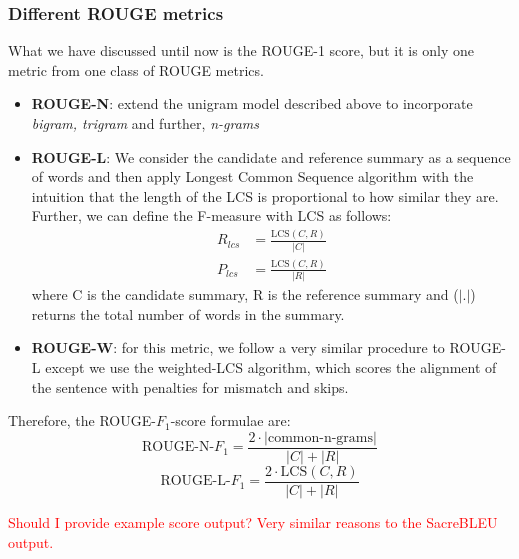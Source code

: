 \documentclass[12pt,a4paper,twoside,openright]{report}
\newcommand{\red}[1]{\textcolor{red}{#1}}
\newcommand{\fone}{$F_1$}
\begin{document}
\subsubsection{Different ROUGE metrics}
What we have discussed until now is the ROUGE-1 score, but it is only one metric from one class of ROUGE metrics.
\begin{itemize}
    \item \textbf{ROUGE-N}: extend the unigram model described above to incorporate \textit{bigram, trigram} and further, \textit{n-grams}
    \item \textbf{ROUGE-L}: We consider the candidate and reference summary as a sequence of words and then apply Longest Common Sequence algorithm with the intuition that the length of the LCS is proportional to how similar they are. Further, we can define the F-measure with LCS as follows:
    \begin{align*}
        R_{lcs} &= \frac{\text{LCS}(C, R)}{|C|} \\
        P_{lcs} &= \frac{\text{LCS}(C, R)}{|R|}
    \end{align*}
    where C is the candidate summary, R is the reference summary and ($|.|$) returns the total number of words in the summary.

    \item \textbf{ROUGE-W}: for this metric, we follow a very similar procedure to ROUGE-L except we use the weighted-LCS algorithm, which scores the alignment of the sentence with penalties for mismatch and skips.
\end{itemize}
Therefore, the ROUGE-\fone-score formulae are:
\begin{equation}
    \text{ROUGE-N-\fone} = \frac{2 \cdot | \text{common-n-grams} |}{|C| + |R|}
    \label{eq:rouge-n}
\end{equation}
\begin{equation}
    \text{ROUGE-L-\fone} = \frac{2 \cdot \text{LCS}(C, R)}{|C| + |R|}
    \label{eq:rouge-l}
\end{equation}

\red{Should I provide example score output? Very similar reasons to the SacreBLEU output.}
\end{document}
